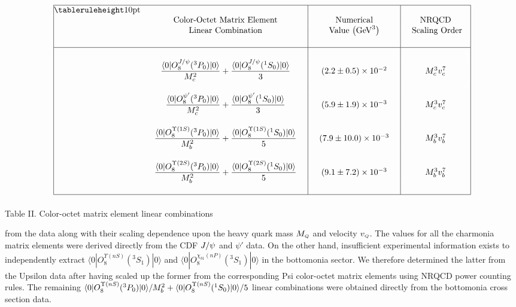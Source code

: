 {%
$$ \vbox{\offinterlineskip
\def\tablerule{\noalign{\hrule}}
\hrule
\halign {\vrule#& \strut#&
\ \hfil#\hfil & \vrule#&
\ \hfil#\hfil & \vrule#&
\ \hfil#\hfil & \vrule# \cr
\tablerule%
height10pt && \omit && \omit && \omit &\cr
&& Color-Octet Matrix Element && Numerical && NRQCD &\cr
&& Linear Combination && Value $\left({\rm GeV}^3\right)$ 
&&\quad Scaling Order\quad&\cr
height10pt && \omit && \omit && \omit & \cr
\tablerule
%
height10pt && \omit && \omit && \omit &\cr
&& \quad $\displaystyle{\langle 0|O_8^{J/\psi}({}^3P_0)|0\rangle
\over\Mc^2} + {\langle 0|O_8^{J/\psi}({}^1S_0)|0\rangle\over3}$ \quad
&& \quad $(2.2\pm 0.5)\times 10^{-2}$ \quad
&& \quad $\Mc^3\vc^7$ \quad &\cr
%
height10pt && \omit && \omit && \omit &\cr
&& \quad $\displaystyle{\langle 0|O_8^{\psi'}({}^3P_0)|0\rangle
\over\Mc^2} + {\langle 0|O_8^{\psi'}({}^1S_0)|0\rangle\over3}$ \quad
&& \quad $(5.9 \pm 1.9)\times 10^{-3}$ \quad
&& \quad $\Mc^3\vc^7$ \quad &\cr
%
height10pt && \omit && \omit && \omit &\cr
&& \quad $\displaystyle{\langle 0|O_8^{\Upsilon(1S)}({}^3P_0)|
0\rangle\over\Mb^2} + {\langle 0|O_8^{\Upsilon(1S)}({}^1S_0)|0\rangle\over5}$ 
\quad && \quad $(7.9 \pm 10.0)\times 10^{-3}$ \quad
&& \quad $\Mb^3\vb^7$ \quad &\cr
%
height10pt && \omit && \omit && \omit &\cr
&& \quad $\displaystyle{\langle 0|O_8^{\Upsilon(2S)}({}^3P_0)|
0\rangle\over\Mb^2} + {\langle 0|O_8^{\Upsilon(2S)}({}^1S_0)|0\rangle\over5}$
\quad && \quad $(9.1\pm 7.2)\times 10^{-3}$ \quad
&& \quad $\Mb^3\vb^7$ \quad &\cr
%
height10pt && \omit && \omit && \omit &\cr
%
\tablerule}} $$
%
\centerline{Table II.  Color-octet matrix element linear combinations}
%
\bigskip\noindent
%
from the data along with their scaling 
dependence upon the heavy quark mass $M_{\scriptscriptstyle Q}$ and velocity $v_{\scriptscriptstyle Q}$.  The values for 
all the charmonia matrix elements were derived directly from 
the CDF $J/\psi$ and $\psi'$ data.  On the other hand, insufficient 
experimental information exists to independently extract 
$\langle 0|O_8^{\Upsilon(nS)}({}^3S_1)|0\rangle$ and
$\langle 0|O_8^{\chi_{b1}(nP)}({}^3S_1)|0\rangle$ in the bottomonia sector.  
We therefore determined the latter from the Upsilon data after having scaled 
up the former from the corresponding Psi color-octet matrix elements 
using NRQCD power counting rules.  The remaining
$\langle 0|O_8^{\Upsilon(nS)}({}^3P_0)| 0\rangle / M_b^2 + 
\langle 0|O_8^{\Upsilon(nS)}({}^1S_0)|0\rangle / 5$ linear combinations were 
obtained directly from the bottomonia cross section data.

}
